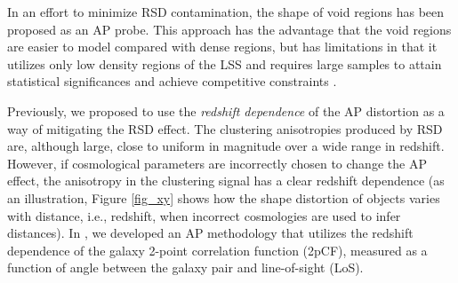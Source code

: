 \documentclass[iop]{emulateapj}
\begin{document}
In an effort to minimize RSD contamination, the shape of void regions \citep{Ryden1995,LavausWandelt1995}  has been 
proposed as an AP probe. This approach has the advantage that the void regions are easier to model compared with dense regions, 
but has limitations in that it utilizes only low density regions of the LSS and requires large samples to attain statistical significances and achieve competitive constraints \citep{Qingqing2016}.


Previously, we proposed to use the {\it redshift dependence} of the AP distortion \citep{Li2014} as a way of mitigating the RSD effect. 
The clustering anisotropies produced by RSD are, although large, close to uniform in magnitude over a wide range in redshift.  
However, if cosmological parameters are incorrectly chosen to change the AP effect, 
the anisotropy in the clustering signal has a clear redshift dependence
(as an illustration, Figure \ref{fig_xy} shows how the shape distortion of objects varies with distance, i.e., redshift, 
when incorrect cosmologies are used to infer distances).
In \cite{Li2015}, we developed an AP methodology 
that utilizes the redshift dependence of the galaxy 2-point correlation function (2pCF), 
measured as a function of angle between the galaxy pair and line-of-sight (LoS).
\end{document}
